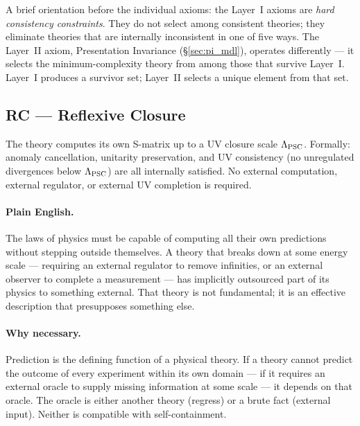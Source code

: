 \documentclass[11pt,openany]{book}
\theoremstyle{remark}
\begin{document}
A brief orientation before the individual axioms: the Layer~I axioms are
\emph{hard consistency constraints}. They do not select among consistent theories;
they eliminate theories that are internally inconsistent in one of five ways.
The Layer~II axiom, Presentation Invariance (\S\ref{sec:pi_mdl}), operates differently
--- it selects the minimum-complexity theory from among those that survive Layer~I.
Layer~I produces a survivor set; Layer~II selects a unique element from that set.

\subsection*{RC --- Reflexive Closure}

\begin{tcolorbox}[colback=green!5,colframe=green!50!black,
  title={Definition: RC --- Reflexive Closure}]
The theory computes its own S-matrix up to a UV closure scale $\Lambda_{\rm PSC}$.
Formally: anomaly cancellation, unitarity preservation, and UV consistency (no
unregulated divergences below $\Lambda_{\rm PSC}$) are all internally satisfied.
No external computation, external regulator, or external UV completion is required.
\end{tcolorbox}

\paragraph{Plain English.}
The laws of physics must be capable of computing all their own predictions without
stepping outside themselves. A theory that breaks down at some energy scale ---
requiring an external regulator to remove infinities, or an external observer to
complete a measurement --- has implicitly outsourced part of its physics to something
external. That theory is not fundamental; it is an effective description that presupposes
something else.

\paragraph{Why necessary.}
Prediction is the defining function of a physical theory. If a theory cannot predict
the outcome of every experiment within its own domain --- if it requires an external
oracle to supply missing information at some scale --- it depends on that oracle. The
oracle is either another theory (regress) or a brute fact (external input). Neither is
compatible with self-containment.
\end{document}
